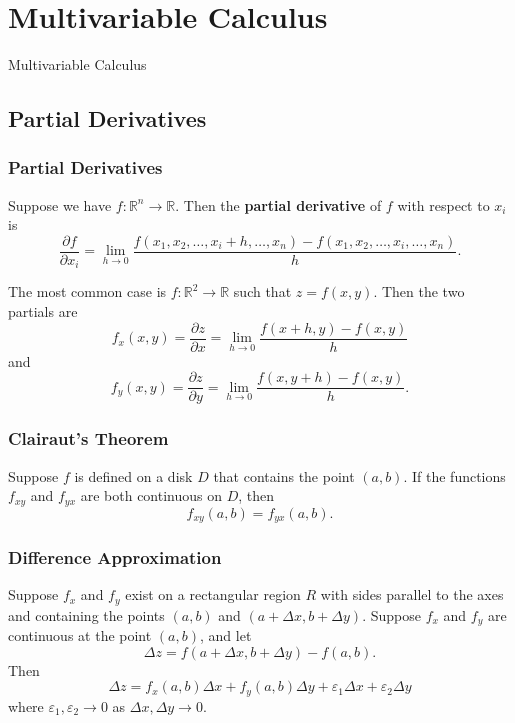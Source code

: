 \documentclass{beamer}
\begin{document}
\section{Multivariable Calculus}
\begin{frame}
\begin{center}
\Huge Multivariable Calculus
\end{center}
\end{frame}


\subsection{Partial Derivatives}

\begin{frame}
\frametitle{Partial Derivatives}
{\small 
\begin{Definition}
Suppose we have $f:\mathbb{R}^n \to \mathbb{R}$. Then the {\bf partial derivative} of $f$ with respect to $x_i$ is
$$
\frac{\partial f}{\partial x_i} = \lim_{h\to 0} \frac{f(x_1, x_2,\ldots, x_i + h,\ldots, x_n) - f(x_1, x_2,\ldots, x_i,\ldots, x_n)}{h}.
$$
\end{Definition}
The most common case is $f:\mathbb{R}^2\to \mathbb{R}$ such that $z = f(x, y)$. Then the two partials are
$$
f_x(x, y) = \frac{\partial z}{\partial x} = \lim_{h\to 0 } \frac{f(x + h, y) - f(x, y)}{h}
$$
and
$$
f_y(x, y) = \frac{\partial z}{\partial y} = \lim_{h\to 0 } \frac{f(x, y + h) - f(x, y)}{h}.
$$

}
\end{frame}

\begin{frame}
\frametitle{Clairaut's Theorem}

\begin{Theorem}[Clairaut]
Suppose $f$ is defined on a disk $D$ that contains the point $(a, b)$. If the functions $f_{xy}$ and $f_{yx}$ are both continuous on $D$, then
$$
f_{xy}(a, b) = f_{yx}(a, b).
$$
\end{Theorem}

\end{frame}

\begin{frame}
\frametitle{Difference Approximation}

\begin{Theorem}
Suppose $f_x$ and $f_y$ exist on a rectangular region $R$ with sides parallel to the axes and containing the points $(a, b)$ and $(a + \Delta x, b + \Delta y)$. Suppose $f_x$ and $f_y$ are continuous at the point $(a, b)$, and let
$$
\Delta z = f(a + \Delta x, b + \Delta y) - f(a, b).
$$
Then
$$
\Delta z = f_x(a, b)\Delta x + f_y(a, b)\Delta y + \varepsilon_1\Delta x + \varepsilon_2\Delta y
$$
where $\varepsilon_1,\varepsilon_2\to 0$ as $\Delta x,\Delta y\to 0$.

\end{Theorem}

\end{frame}
\end{document}
